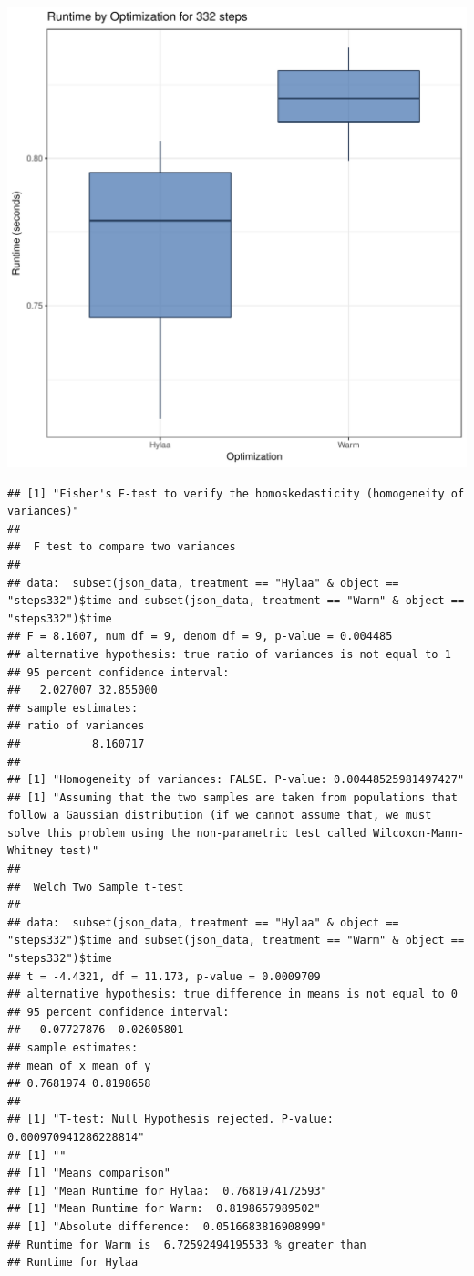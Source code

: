 \documentclass{article}\usepackage[]{graphicx}\usepackage[]{color}
\makeatletter
\def\maxwidth{ %
  \ifdim\Gin@nat@width>\linewidth
    \linewidth
  \else
    \Gin@nat@width
  \fi
}
\newenvironment{kframe}{%
 \def\at@end@of@kframe{}%
 \ifinner\ifhmode%
  \def\at@end@of@kframe{\end{minipage}}%
  \begin{minipage}{\columnwidth}%
 \fi\fi%
 \def\FrameCommand##1{\hskip\@totalleftmargin \hskip-\fboxsep
 \colorbox{shadecolor}{##1}\hskip-\fboxsep
     \hskip-\linewidth \hskip-\@totalleftmargin \hskip\columnwidth}%
 \MakeFramed {\advance\hsize-\width
   \@totalleftmargin\z@ \linewidth\hsize
   \@setminipage}}%
 {\par\unskip\endMakeFramed%
 \at@end@of@kframe}
\newenvironment{knitrout}{}{} %
\makeatother
\begin{document}
\begin{knitrout}
\color{fgcolor}
\includegraphics[width=\maxwidth]{figure/RH1_steps332-1} 
\begin{kframe}\begin{verbatim}
## [1] "Fisher's F-test to verify the homoskedasticity (homogeneity of variances)"
## 
## 	F test to compare two variances
## 
## data:  subset(json_data, treatment == "Hylaa" & object == "steps332")$time and subset(json_data, treatment == "Warm" & object == "steps332")$time
## F = 8.1607, num df = 9, denom df = 9, p-value = 0.004485
## alternative hypothesis: true ratio of variances is not equal to 1
## 95 percent confidence interval:
##   2.027007 32.855000
## sample estimates:
## ratio of variances 
##           8.160717 
## 
## [1] "Homogeneity of variances: FALSE. P-value: 0.00448525981497427"
## [1] "Assuming that the two samples are taken from populations that follow a Gaussian distribution (if we cannot assume that, we must solve this problem using the non-parametric test called Wilcoxon-Mann-Whitney test)"
## 
## 	Welch Two Sample t-test
## 
## data:  subset(json_data, treatment == "Hylaa" & object == "steps332")$time and subset(json_data, treatment == "Warm" & object == "steps332")$time
## t = -4.4321, df = 11.173, p-value = 0.0009709
## alternative hypothesis: true difference in means is not equal to 0
## 95 percent confidence interval:
##  -0.07727876 -0.02605801
## sample estimates:
## mean of x mean of y 
## 0.7681974 0.8198658 
## 
## [1] "T-test: Null Hypothesis rejected. P-value: 0.000970941286228814"
## [1] ""
## [1] "Means comparison"
## [1] "Mean Runtime for Hylaa:  0.7681974172593"
## [1] "Mean Runtime for Warm:  0.8198657989502"
## [1] "Absolute difference:  0.0516683816908999"
## Runtime for Warm is  6.72592494195533 % greater than 
## Runtime for Hylaa
\end{verbatim}
\end{kframe}
\end{knitrout}
\end{document}
